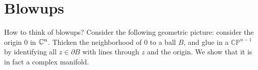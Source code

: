 \section{Blowups}
\newcommand{\CP}{\mathbb{CP}}
\newcommand{\del}{\partial}

How to think of blowups? Consider the following geometric picture: 
consider the origin $0$ in $\mathbb{C}^n$. Thicken the neighborhood of 
$0$ to a ball $B$, and glue in a $\CP^{n - 1}$ by identifying all
$z \in \del B$ with lines through $z$ and the origin. We show that
it is in fact a complex manifold.


